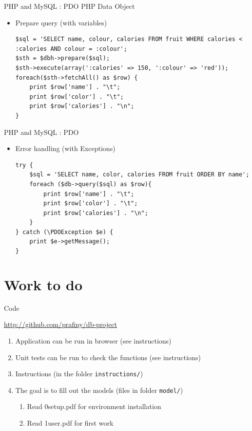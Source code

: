 \documentclass{beamer}
\begin{document}
\begin{frame}[fragile]{PHP and MySQL : PDO}
    PHP Data Object
    
    \begin{itemize}
        \item Prepare query (with variables)
            \begin{lstlisting}
$sql = 'SELECT name, colour, calories FROM fruit WHERE calories < :calories AND colour = :colour';
$sth = $dbh->prepare($sql);
$sth->execute(array(':calories' => 150, ':colour' => 'red'));
foreach($sth->fetchAll() as $row) {
    print $row['name'] . "\t";
    print $row['color'] . "\t";
    print $row['calories'] . "\n";
}
            \end{lstlisting}
	\end{itemize}
\end{frame}

\begin{frame}[fragile]{PHP and MySQL : PDO}
    \begin{itemize}
\item Error handling (with Exceptions)
            \begin{lstlisting}
try {
    $sql = 'SELECT name, color, calories FROM fruit ORDER BY name';
    foreach ($db->query($sql) as $row){
        print $row['name'] . "\t";
        print $row['color'] . "\t";
        print $row['calories'] . "\n";
	}
} catch (\PDOException $e) {
	print $e->getMessage();
}
            \end{lstlisting}
    \end{itemize}
\end{frame}

\section{Work to do}

\begin{frame}{Code}
    \begin{center}
        \url{http://github.com/prafiny/db-project}
    \end{center}

\begin{enumerate}

\item Application can be run in browser (see instructions)
\item Unit tests can be run to check the functions (see instructions)
\item Instructions (in the folder \texttt{instructions/})
\item The goal is to fill out the models (files in folder \texttt{model/})
\begin{enumerate}
\item Read 0setup.pdf for environment installation
\item Read 1user.pdf for first work
\end{enumerate}
\end{enumerate}

\end{frame}
\end{document}
